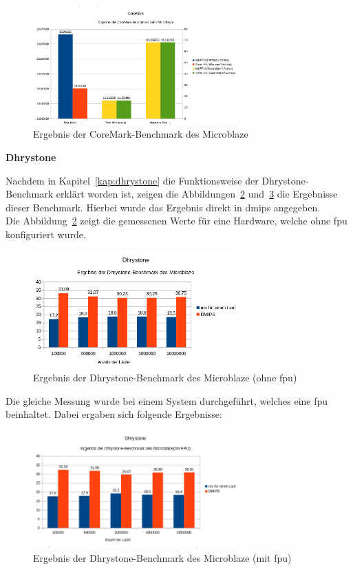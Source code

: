 \begin{figure}[H]
\centering
\includegraphics[width=0.7\textwidth]{Hauptteil/coremarkmb.png}
\caption{Ergebnis der CoreMark-Benchmark des Microblaze}
\label{fig:coremarkmb}
\end{figure}

\textbf{Dhrystone}

Nachdem in Kapitel~\ref{kap:dhrystone} die Funktionsweise der Dhrystone-Benchmark erklärt worden ist, zeigen die Abbildungen~\ref{fig:dhrystonembohnefpu} und~\ref{fig:dhrystonembmitfpu} die Ergebnisse dieser Benchmark.
Hierbei wurde das Ergebnis direkt in \ac{dmips} angegeben.\\
Die Abbildung~\ref{fig:dhrystonembohnefpu} zeigt die gemessenen Werte für eine Hardware, welche ohne \ac{fpu} konfiguriert wurde.

\begin{figure}[H]
\centering
\includegraphics[width=0.7\textwidth]{Hauptteil/dhrystonembohnefpu.png}
\caption{Ergebnis der Dhrystone-Benchmark des Microblaze (ohne \ac{fpu})}
\label{fig:dhrystonembohnefpu}
\end{figure}

Die gleiche Messung wurde bei einem System durchgeführt, welches eine \ac{fpu} beinhaltet. Dabei ergaben sich folgende Ergebnisse:\\

\begin{figure}[H]
\centering
\includegraphics[width=0.7\textwidth]{Hauptteil/dhrystonembmitfpu.png}
\caption{Ergebnis der Dhrystone-Benchmark des Microblaze (mit \ac{fpu})}
\label{fig:dhrystonembmitfpu}
\end{figure}

